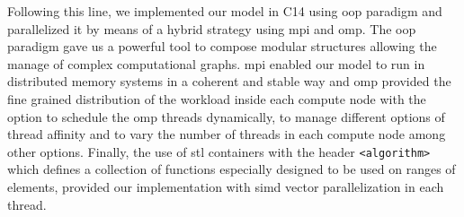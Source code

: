 \documentclass[11pt,a4paper]{article}
\newcommand{\CC}{C\nolinebreak\hspace{-.05em}\raisebox{.4ex}{\tiny\bf +}\nolinebreak\hspace{-.10em}\raisebox{.4ex}{\tiny\bf +}}
\begin{document}
Following this line, we implemented our model in \CC14 using \gls{oop} paradigm and parallelized it by means of a hybrid strategy using \gls{mpi} and \gls{omp}. The \gls{oop} paradigm gave us a powerful tool to compose modular structures allowing the manage of complex computational graphs. \gls{mpi} enabled our model to run in distributed memory systems in a coherent and stable way and \gls{omp} provided the fine grained distribution of the workload inside each compute node with the option to schedule the \gls{omp} threads dynamically, to manage different options of thread affinity and to vary the number of threads in each compute node among other options. Finally, the use of \gls{stl} containers with the header \texttt{<algorithm>} which defines a collection of functions especially designed to be used on ranges of elements, provided our implementation with \gls{simd} vector parallelization in each thread.








\end{document}
